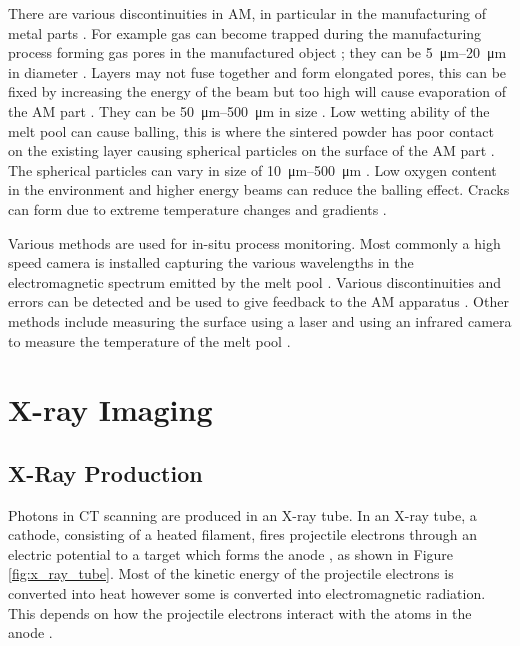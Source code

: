 There are various discontinuities in AM, in particular in the manufacturing of metal parts \citep{everton2016review}. For example gas can become trapped during the manufacturing process forming gas pores in the manufactured object \citep{thijs2010study, tammas2015xct}; they can be \SIrange{5}{20}{\micro\metre} in diameter \citep{everton2016review}. Layers may not fuse together and form elongated pores, this can be fixed by increasing the energy of the beam but too high will cause evaporation of the AM part \citep{mumtaz2008high}. They can be \SIrange{50}{500}{\micro\metre} in size \citep{everton2016review}. Low wetting ability of the melt pool can cause balling, this is where the sintered powder has poor contact on the existing layer causing spherical particles on the surface of the AM part \citep{li2012balling, gu2009balling}. The spherical particles can vary in size of \SIrange{10}{500}{\micro\metre} \citep{li2012balling}. Low oxygen content in the environment \citep{niu1999instability} and higher energy beams \citep{gu2009balling} can reduce the balling effect. Cracks can form due to extreme temperature changes and gradients \citep{mercelis2006residual, zaeh2010investigations}.

Various methods are used for in-situ process monitoring. Most commonly a high speed camera is installed capturing the various wavelengths in the electromagnetic spectrum emitted by the melt pool \citep{berumen2010quality, craeghs2011online, lott2011design}. Various discontinuities and errors can be detected \citep{clijsters2014in} and be used to give feedback to the AM apparatus \citep{herzog2013method}. Other methods include measuring the surface using a laser \citep{cerniglia2015inspection} and using an infrared camera to measure the temperature of the melt pool \citep{rodriguez2012integration}. 

\section{X-ray Imaging}

\subsection{X-Ray Production}
Photons in CT scanning are produced in an X-ray tube. In an X-ray tube, a cathode, consisting of a heated filament, fires projectile electrons through an electric potential to a target which forms the anode \citep{michael2001x}, as shown in Figure \ref{fig:x_ray_tube}. Most of the kinetic energy of the projectile electrons is converted into heat however some is converted into electromagnetic radiation. This depends on how the projectile electrons interact with the atoms in the anode \citep{cantatore2011introduction}.

